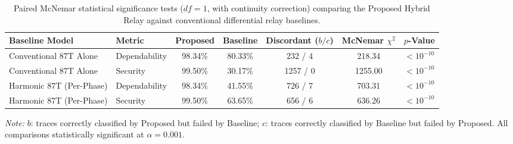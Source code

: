 \begin{table}[H]\centering
\caption{Paired McNemar statistical significance tests ($df=1$, with continuity correction) comparing the Proposed Hybrid Relay against conventional differential relay baselines.}\label{tab:6.3_stats}
\small
\begin{tabular}{@{}llccccc@{}}\toprule
\textbf{Baseline Model} & \textbf{Metric} & \textbf{Proposed} & \textbf{Baseline} & \textbf{Discordant ($b/c$)} & \textbf{McNemar $\chi^2$} & \textbf{$p$-Value}\\ \midrule
Conventional 87T Alone & Dependability & 98.34\% & 80.33\% & 232 / 4 & 218.34 & $< 10^{-10}$\\
Conventional 87T Alone & Security & 99.50\% & 30.17\% & 1257 / 0 & 1255.00 & $< 10^{-10}$\\
\midrule
Harmonic 87T (Per-Phase) & Dependability & 98.34\% & 41.55\% & 726 / 7 & 703.31 & $< 10^{-10}$\\
Harmonic 87T (Per-Phase) & Security & 99.50\% & 63.65\% & 656 / 6 & 636.26 & $< 10^{-10}$\\
\bottomrule
\end{tabular}
\vspace{3pt}\raggedright\footnotesize\textit{Note:} $b$: traces correctly classified by Proposed but failed by Baseline; $c$: traces correctly classified by Baseline but failed by Proposed. All comparisons statistically significant at $\alpha = 0.001$.
\end{table}